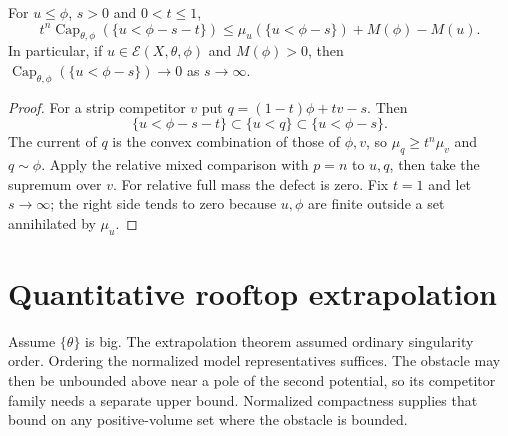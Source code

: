 \begin{proposition}\label{prop:relative-capacity-sublevel-estimate}
For $u\leq\phi$, $s>0$ and $0<t\leq1$,
\[
 t^n\operatorname{Cap}_{\theta,\phi}(\{u<\phi-s-t\})
       \leq\mu_u(\{u<\phi-s\})+M(\phi)-M(u).
\]
In particular, if $u\in\mathcal E(X,\theta,\phi)$ and $M(\phi)>0$, then
$\operatorname{Cap}_{\theta,\phi}(\{u<\phi-s\})\to0$ as $s\to\infty$.
\end{proposition}
\begin{proof}
For a strip competitor $v$ put $q=(1-t)\phi+tv-s$. Then
\[
 \{u<\phi-s-t\}\subset\{u<q\}\subset\{u<\phi-s\}.
\]
The current of $q$ is the convex combination of those of $\phi,v$, so $\mu_q\geq t^n\mu_v$ and $q\sim\phi$. Apply the relative mixed comparison with $p=n$ to $u,q$, then take the supremum over $v$. For relative full mass the defect is zero. Fix $t=1$ and let $s\to\infty$; the right side tends to zero because $u,\phi$ are finite outside a set annihilated by $\mu_u$.
\end{proof}

\section{Quantitative rooftop extrapolation}
\label{sec:quantitative-rooftop-extrapolation}
Assume $\{\theta\}$ is big. The extrapolation theorem assumed ordinary singularity order. Ordering the normalized model representatives suffices. The obstacle may then be unbounded above near a pole of the second potential, so its competitor family needs a separate upper bound. Normalized compactness supplies that bound on any positive-volume set where the obstacle is bounded.

